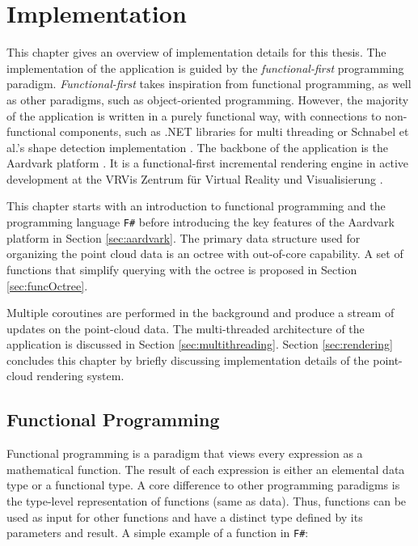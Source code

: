 \chapter{Implementation}
\label{chap:implementation}

This chapter gives an overview of implementation details for this thesis. The implementation of the application is guided by the \textit{functional-first} programming paradigm. \textit{Functional-first} takes inspiration from functional programming, as well as other paradigms, such as object-oriented programming. However, the majority of the application is written in a purely functional way, with connections to non-functional components, such as .NET libraries for multi threading or Schnabel et al.'s shape detection implementation \cite{schnabel-2007-software}. The backbone of the application is the Aardvark platform \cite{aardvark}. It is a functional-first incremental rendering engine in active development at the VRVis Zentrum für Virtual Reality und Visualisierung \cite{vrvis}.

\par

This chapter starts with an introduction to functional programming and the programming language \verb|F#| \cite{FSharp} before introducing the key features of the Aardvark platform in Section \ref{sec:aardvark}. The primary data structure used for organizing the point cloud data is an octree with out-of-core capability. A set of functions that simplify querying with the octree is proposed in Section \ref{sec:funcOctree}. 

\par

Multiple coroutines are performed in the background and produce a stream of updates on the point-cloud data. The multi-threaded architecture of the application is discussed in Section \ref{sec:multithreading}. Section \ref{sec:rendering} concludes this chapter by briefly discussing implementation details of the point-cloud rendering system. 


\section{Functional Programming}
\label{sec:funprog}

Functional programming is a paradigm that views every expression as a mathematical function. The result of each expression is either an elemental data type or a functional type. A core difference to other programming paradigms is the type-level representation of functions (same as data). Thus, functions can be used as input for other functions and have a distinct type defined by its parameters and result. A simple example of a function in \verb|F#|: 

